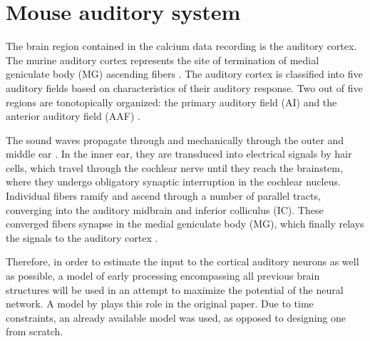 
\section{Mouse auditory system}
The brain region contained in the calcium data recording is the auditory cortex. The murine auditory cortex represents the site of termination of medial geniculate body (MG) ascending fibers \parencite{malmiercaAuditorySystem2012}. The auditory cortex is classified into five auditory fields based on characteristics of their auditory response. Two out of five regions are tonotopically organized: the primary auditory field (AI) and the anterior auditory field (AAF) \parencite{malmiercaAuditorySystem2012}.


The sound waves propagate through and mechanically through the outer and middle ear \parencite{malmiercaAuditorySystem2012}. In the inner ear, they are transduced into electrical signals by hair cells, which travel through the cochlear nerve until they reach the brainstem, where they undergo obligatory synaptic interruption in the cochlear nucleus. Individual fibers ramify and ascend through a number of parallel tracts, converging into the auditory midbrain and inferior colliculus (IC). These converged fibers synapse in the medial geniculate body (MG), which finally relays the signals to the auditory cortex \parencite{malmiercaAuditorySystem2012}.

Therefore, in order to estimate the input to the cortical auditory neurons as well as possible, a model of early processing encompassing all previous brain structures will be used in an attempt to maximize the potential of the neural network. A model by \textcite{yangAuditoryRepresentationsAcoustic1992} plays this role in the original paper. Due to time constraints, an already available model was used, as opposed to designing one from scratch.

